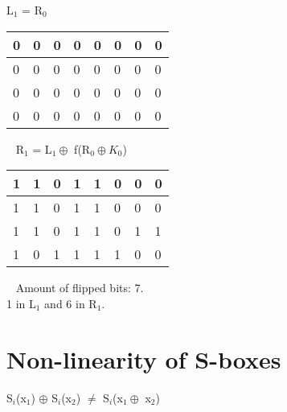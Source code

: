 \noindent
L$_{1}$ = R$_{0}$ \\
\begin{tabular}{ | l | l | l | l | l | l | l |  l |} \hline
	0 & 0 & 0 & 0 & 0 &  0 & 0 & 0 \\ \hline
	0 & 0 & 0 & 0 & 0 &  0 & 0 & 0 \\ \hline
	0 & 0 & 0 & 0 & 0 &  0 & 0 & 0 \\ \hline
	0 & 0 & 0 & 0 & 0 &  0 & 0 & 0 \\ \hline
\end{tabular}
~
\vspace{0.5em}\newline\noindent
R$_{1}$ = L$_{1} \oplus$ f(R$_{0} \oplus K_{0}$)\\
\begin{tabular}{ | l | l | l | l | l | l | l |  l |} \hline
	1 & 1 & 0 & 1 & 1 &  0 & 0 & 0 \\ \hline
	1 & 1 & 0 & 1 & 1 &  0 & 0 & 0 \\ \hline
	1 & 1 & 0 & 1 & 1 &  0 & 1 & 1 \\ \hline
	1 & 0 & 1 & 1 & 1 &  1 & 0 & 0 \\ \hline
\end{tabular}
~
\vspace{0.5em}\newline\noindent
Amount of flipped bits: 7. \\ 
1 in L$_{1}$ and 6 in R$_{1}$.

\section{Non-linearity of S-boxes}
S$_{i}$(x$_{1}$) $\oplus$ S$_{i}$(x$_{2}$) $\neq$ S$_{i}$(x$_{1} \oplus$ x$_{2}$)

\begin{comment}
An important property of DES is the non-linearity of the S-boxes. In this exercise we want to verify
this property by comparing the output bits for different input bits in a specific S-box S i. Show that for
S_5 the following computation rule can be applied: 2
S i(x1) bXOR S i(x2) , S i(x_1 bXOR x_2):
"bXOR" is called a bitwise XOR.
\end{comment}

